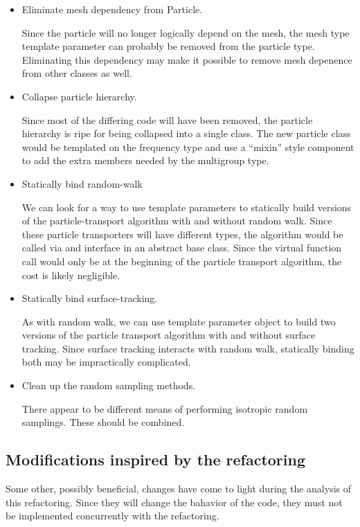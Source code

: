 \documentclass[memo]{ResearchNote}
\begin{document}
\begin{itemize}
\item Eliminate mesh dependency from Particle.

  Since the particle will no longer logically depend on the mesh, the
  mesh type template parameter can probably be removed from the
  particle type. Eliminating this dependency may make it possible to
  remove mesh depenence from other classes as well.
      
\item Collapse particle hierarchy. 
  
  Since most of the differing code will have been removed, the
  particle hierarchy is ripe for being collapsed into a single class.
  The new particle class would be templated on the frequency type and
  use a ``mixin'' style component to add the extra members needed by
  the multigroup type.

\item Statically bind random-walk
  
  We can look for a way to use template parameters to statically build
  versions of the particle-transport algorithm with and without random
  walk. Since these particle transporters will have different types,
  the algorithm would be called via and interface in an abstract base
  class. Since the virtual function call would only be at the
  beginning of the particle transport algorithm, the cost is likely
  negligible.
  
\item Statically bind surface-tracking. 

  As with random walk, we can use template parameter object to build
  two versions of the particle transport algorithm with and without
  surface tracking. Since surface tracking interacts with random walk,
  statically binding both may be impractically complicated. 

\item Clean up the random sampling methods.

  There appear to be different means of performing isotropic random
  samplings. These should be combined.

\end{itemize}

\subsection{Modifications inspired by the refactoring}

Some other, possibly beneficial, changes have come to light during the
analysis of this refactoring. Since they will change the bahavior of
the code, they must not be implemented concurrently with the refactoring.
\end{document}
